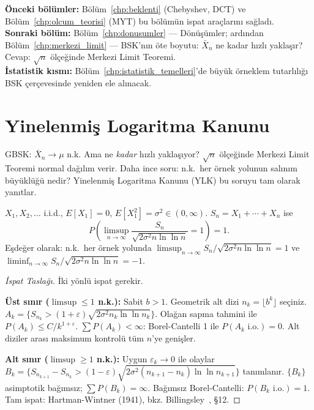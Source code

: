 \begin{kopru}
\textbf{Önceki bölümler:} Bölüm~\ref{chp:beklenti} (Chebyshev, DCT) ve
Bölüm~\ref{chp:olcum_teorisi} (MYT) bu bölümün ispat araçlarını sağladı.\\
\textbf{Sonraki bölüm:} Bölüm~\ref{chp:donusumler} --- Dönüşümler;
ardından Bölüm~\ref{chp:merkezi_limit} --- BSK'nın öte boyutu:
$\bar{X}_n$ ne kadar hızlı yaklaşır? Cevap: $\sqrt{n}$ ölçeğinde Merkezi Limit Teoremi.\\
\textbf{İstatistik kısmı:} Bölüm~\ref{chp:istatistik_temelleri}'de büyük örneklem
tutarlılığı BSK çerçevesinde yeniden ele alınacak.
\end{kopru}

\section{Yinelenmiş Logaritma Kanunu}
\label{sec:yil_kanunu}

\begin{motivasyon}
GBSK: $\bar{X}_n \to \mu$ n.k. Ama ne \emph{kadar} hızlı yaklaşıyor?
$\sqrt{n}$ ölçeğinde Merkezi Limit Teoremi normal dağılım verir.
Daha ince soru: n.k.\ her örnek yolunun salınım büyüklüğü nedir?
Yinelenmiş Logaritma Kanunu (YLK) bu soruyu tam olarak yanıtlar.
\end{motivasyon}

\begin{teorem}
\label{thm:ylk}
$X_1, X_2, \ldots$ i.i.d., $E[X_1] = 0$, $E[X_1^2] = \sigma^2 \in (0,\infty)$.
$S_n = X_1 + \cdots + X_n$ ise
\[
  P\!\left(\limsup_{n\to\infty} \frac{S_n}{\sqrt{2\sigma^2 n \ln\ln n}} = 1\right) = 1.
\]
Eşdeğer olarak: n.k.\ her örnek yolunda
$\limsup_{n\to\infty} S_n/\sqrt{2\sigma^2 n\ln\ln n} = 1$
ve $\liminf_{n\to\infty} S_n/\sqrt{2\sigma^2 n\ln\ln n} = -1$.
\end{teorem}

\begin{proof}[İspat Taslağı]
İki yönlü ispat gerekir.

\textbf{Üst sınır ($\limsup \leq 1$ n.k.):}
Sabit $b > 1$. Geometrik alt dizi $n_k = \lfloor b^k \rfloor$ seçiniz.
$A_k = \{S_{n_k} > (1+\varepsilon)\sqrt{2\sigma^2 n_k \ln\ln n_k}\}$.
Olağan sapma tahmini ile $P(A_k) \leq C/k^{1+\varepsilon}$.
$\sum P(A_k) < \infty$: Borel-Cantelli 1 ile $P(A_k \text{ i.o.}) = 0$.
Alt diziler arası maksimum kontrolü tüm $n$'ye genişler.

\textbf{Alt sınır ($\limsup \geq 1$ n.k.):}
Uygun $\varepsilon_k \to 0$ ile olaylar
$B_k = \{S_{n_{k+1}} - S_{n_k} > (1-\varepsilon)\sqrt{2\sigma^2(n_{k+1}-n_k)\ln\ln n_{k+1}}\}$
tanımlanır. $\{B_k\}$ asimptotik bağımsız; $\sum P(B_k) = \infty$.
Bağımsız Borel-Cantelli: $P(B_k \text{ i.o.}) = 1$.
Tam ispat: Hartman-Wintner (1941), bkz. Billingsley~\cite{Billingsley1995}, §12.
\end{proof}

